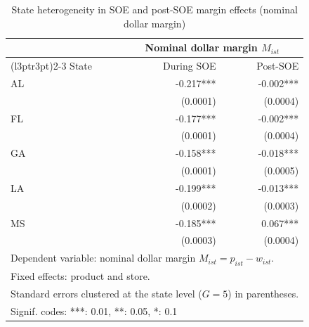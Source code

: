 \begin{table}[!h]
\centering
\caption{\label{tab:tab:margin_reg_state_heterog}State heterogeneity in SOE and post-SOE margin effects (nominal dollar margin)}
\centering
\begin{tabular}[t]{lrr}
\toprule
\multicolumn{1}{c}{ } & \multicolumn{2}{c}{Nominal dollar margin $M_{ist}$} \\
\cmidrule(l{3pt}r{3pt}){2-3}
State & During SOE & Post-SOE\\
\midrule
AL & -0.217*** & -0.002***\\
 & (0.0001) & (0.0004)\\
FL & -0.177*** & -0.002***\\
 & (0.0001) & (0.0004)\\
GA & -0.158*** & -0.018***\\
\addlinespace
 & (0.0001) & (0.0005)\\
LA & -0.199*** & -0.013***\\
 & (0.0002) & (0.0003)\\
MS & -0.185*** & 0.067***\\
 & (0.0003) & (0.0004)\\
\bottomrule
\multicolumn{3}{l}{\rule{0pt}{1em}Dependent variable: nominal dollar margin $M_{ist} = p_{ist} - w_{ist}$.}\\
\multicolumn{3}{l}{\rule{0pt}{1em}Fixed effects: product and store.}\\
\multicolumn{3}{l}{\rule{0pt}{1em}Standard errors clustered at the state level ($G = 5$) in parentheses.}\\
\multicolumn{3}{l}{\rule{0pt}{1em}Signif. codes: ***: 0.01, **: 0.05, *: 0.1}\\
\end{tabular}
\end{table}
